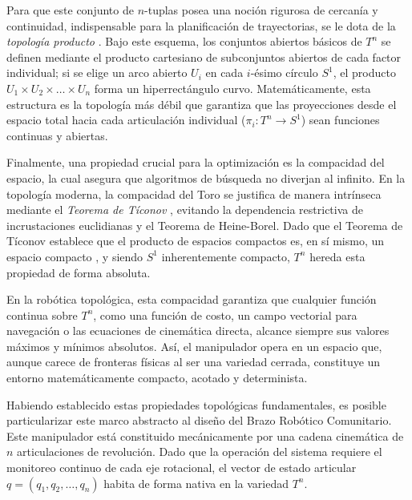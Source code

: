 Para que este conjunto de $n$-tuplas posea una noción rigurosa de cercanía y 
continuidad, indispensable para la planificación de trayectorias, se le dota de 
la \textit{topología producto} \parencite{antonyan2016topologia}. Bajo este esquema, 
los conjuntos abiertos básicos de $T^n$ se definen mediante el producto 
cartesiano de subconjuntos abiertos de cada factor individual; si se elige un 
arco abierto $U_i$ en cada $i$-ésimo círculo $S^1$, el 
producto $U_1 \times U_2 \times \dots \times U_n$ forma un hiperrectángulo curvo. 
Matemáticamente, esta estructura es la topología más débil que garantiza que 
las proyecciones desde el espacio total hacia cada articulación 
individual ($\pi_i: T^n \to S^1$) sean funciones continuas y abiertas.

Finalmente, una propiedad crucial para la optimización es la compacidad del espacio, 
la cual asegura que algoritmos de búsqueda no diverjan al infinito. En la 
topología moderna, la compacidad del Toro se justifica de manera intrínseca 
mediante el \textit{Teorema de Tíconov} \parencite{waldmann2014topology}, evitando la 
dependencia restrictiva de incrustaciones euclidianas y el Teorema de Heine-Borel. 
Dado que el Teorema de Tíconov establece que el producto de espacios 
compactos es, en sí mismo, un espacio compacto \parencite{antonyan2016topologia}, y 
siendo $S^1$ inherentemente compacto, $T^n$ hereda esta propiedad de forma absoluta.

En la robótica topológica, esta compacidad garantiza que cualquier 
función continua sobre $T^n$, como una función de costo, un campo vectorial 
para navegación o las ecuaciones de cinemática directa, alcance siempre sus valores 
máximos y mínimos absolutos. Así, el manipulador opera en un espacio que, 
aunque carece de fronteras físicas al ser una variedad cerrada, constituye 
un entorno matemáticamente compacto, acotado y determinista.


Habiendo establecido estas propiedades topológicas fundamentales, 
es posible particularizar este marco abstracto al diseño del Brazo Robótico Comunitario. 
Este manipulador está constituido mecánicamente por una cadena cinemática de $n$ 
articulaciones de revolución. Dado que la operación del sistema requiere el 
monitoreo continuo de cada eje rotacional, el vector de estado articular 
$q = (q_1, q_2, \dots, q_n)$ habita de forma nativa en la variedad $T^n$.

